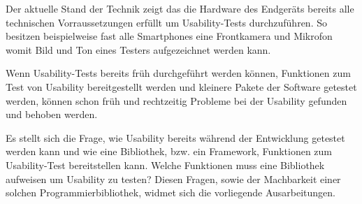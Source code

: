Der aktuelle Stand der Technik zeigt das die Hardware des Endgeräts bereits alle technischen Vorraussetzungen erfüllt um Usability-Tests durchzuführen. So besitzen beispielweise fast alle Smartphones eine Frontkamera und Mikrofon womit Bild und Ton eines Testers aufgezeichnet werden kann. 

Wenn Usability-Tests bereits früh durchgeführt werden können, Funktionen zum Test von Usability bereitgestellt werden und kleinere Pakete der Software getestet werden, können schon früh und rechtzeitig Probleme bei der Usability gefunden und behoben werden.

Es stellt sich die Frage, wie Usability bereits während der Entwicklung getestet werden kann und wie eine Bibliothek, bzw. ein Framework, Funktionen zum Usability-Test bereitstellen kann. Welche Funktionen muss eine Bibliothek aufweisen um Usability zu testen? Diesen Fragen, sowie der Machbarkeit einer solchen Programmierbibliothek, widmet sich die vorliegende Ausarbeitungen. %




